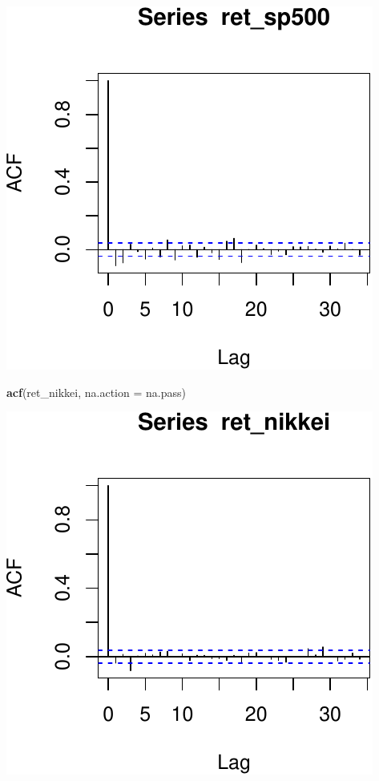 \documentclass[11pt,]{article}
\newenvironment{Shaded}{\begin{snugshade}}{\end{snugshade}}
\newcommand{\KeywordTok}[1]{\textcolor[rgb]{0.13,0.29,0.53}{\textbf{#1}}}
\newcommand{\DataTypeTok}[1]{\textcolor[rgb]{0.13,0.29,0.53}{#1}}
\newcommand{\NormalTok}[1]{#1}
\begin{document}
\begin{center}\includegraphics{FMC_T4_PhD_ARMA_GARCH_files/figure-latex/sample_ACF-2} \end{center}

\begin{Shaded}
\begin{Highlighting}[]
\KeywordTok{acf}\NormalTok{(ret_nikkei, }\DataTypeTok{na.action =}\NormalTok{ na.pass)}
\end{Highlighting}
\end{Shaded}

\begin{center}\includegraphics{FMC_T4_PhD_ARMA_GARCH_files/figure-latex/sample_ACF-3} \end{center}
\end{document}
